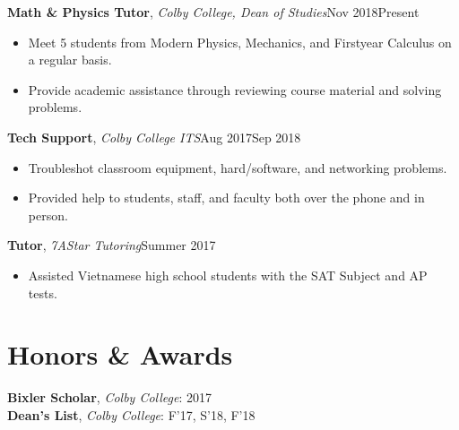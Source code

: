 \documentclass[a4paper, 10.5pt]{article}
\begin{document}
	\indent \indent \textbf{Math \& Physics Tutor}, \textit{Colby College, Dean of Studies}\hfill Nov 2018\textemdash Present
	\begin{itemize}[noitemsep, nolistsep]
		\setlength{\itemindent}{0.2in}
		\item Meet 5 students from Modern Physics, Mechanics, and First\textendash year Calculus on a regular basis.
		\item Provide academic assistance through reviewing course material and solving problems.\\
	\end{itemize}
	\indent \indent \textbf{Tech Support}, \textit{Colby College ITS}\hfill Aug 2017\textemdash Sep 2018
	\begin{itemize}[noitemsep, nolistsep]
		\setlength{\itemindent}{0.2in}
		\item Troubleshot classroom equipment, hard/software, and networking problems.
		\item Provided help to students, staff, and faculty both over the phone and in person.\\
	\end{itemize}
	\indent \indent \textbf{Tutor}, \textit{7AStar Tutoring}\hfill Summer 2017
	\begin{itemize}[noitemsep, nolistsep]
		\setlength{\itemindent}{0.2in}
		\item Assisted Vietnamese high school students with the SAT Subject and AP tests.\\
	\end{itemize}

	\section*{\normalsize{{\color{colby}Honors \& Awards}}}
	\indent \textbf{Bixler Scholar}, \textit{Colby College}: 2017\\
	\indent \textbf{Dean's List}, \textit{Colby College}: F'17, S'18, F'18\\
	
\end{document}

